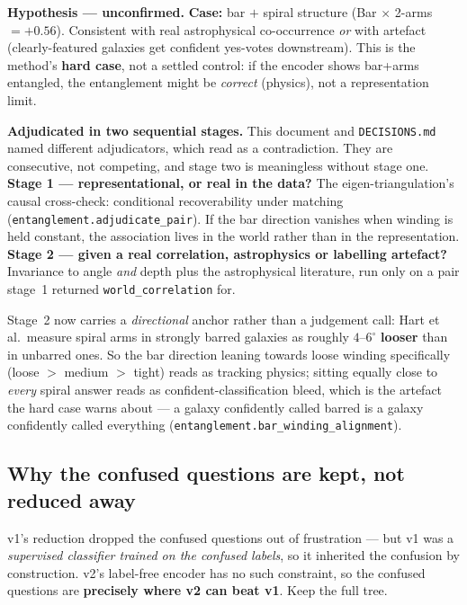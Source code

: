 \documentclass[11pt,a4paper]{article}
\begin{document}
\begin{deferredbox}
\textbf{Hypothesis --- unconfirmed.} \textbf{Case:} bar $+$ spiral structure (Bar $\times$
2-arms $= +0.56$). Consistent with real astrophysical co-occurrence \emph{or} with artefact
(clearly-featured galaxies get confident yes-votes downstream). This is the method's
\textbf{hard case}, not a settled control: if the encoder shows bar+arms entangled, the
entanglement might be \emph{correct} (physics), not a representation limit.

\textbf{Adjudicated in two sequential stages.} This document and \texttt{DECISIONS.md} named
different adjudicators, which read as a contradiction. They are consecutive, not competing, and
stage two is meaningless without stage one. \textbf{Stage 1 --- representational, or real in the
data?} The eigen-triangulation's causal cross-check: conditional recoverability under matching
(\texttt{entanglement.adjudicate\_pair}). If the bar direction vanishes when winding is held
constant, the association lives in the world rather than in the representation. \textbf{Stage 2
--- given a real correlation, astrophysics or labelling artefact?} Invariance to angle \emph{and}
depth plus the astrophysical literature, run only on a pair stage~1 returned
\texttt{world\_correlation} for.

Stage~2 now carries a \emph{directional} anchor rather than a judgement call: Hart et al.\ measure
spiral arms in strongly barred galaxies as roughly $4$--$6^\circ$ \textbf{looser} than in unbarred
ones. So the bar direction leaning towards loose winding specifically (loose $>$ medium $>$ tight)
reads as tracking physics; sitting equally close to \emph{every} spiral answer reads as
confident-classification bleed, which is the artefact the hard case warns about --- a galaxy
confidently called barred is a galaxy confidently called everything
(\texttt{entanglement.bar\_winding\_alignment}).
\end{deferredbox}

\subsection{Why the confused questions are kept, not reduced away}

v1's reduction dropped the confused questions out of frustration --- but v1 was a
\emph{supervised classifier trained on the confused labels}, so it inherited the confusion by
construction. v2's label-free encoder has no such constraint, so the confused questions are
\textbf{precisely where v2 can beat v1}. Keep the full tree.
\end{document}
